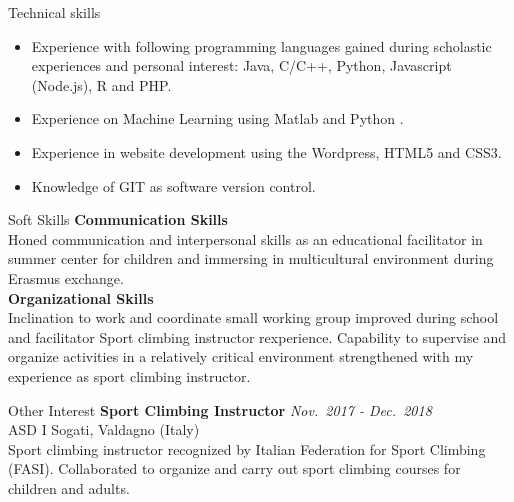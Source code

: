 \documentclass{resume} %
\begin{document}
\begin{rSection}{Technical skills}
    \begin{itemize}        
        \item Experience with following programming languages gained during scholastic experiences and personal interest: Java, C/C++, Python, Javascript (Node.js), R and PHP.
        \item Experience on Machine Learning using Matlab and Python .
        \item Experience in website development using the Wordpress, HTML5 and CSS3.
        \item Knowledge of GIT as software version control.
    \end{itemize}    
\end{rSection}

\begin{rSection}{Soft Skills}
        {\bf Communication Skills}\\
        Honed communication and interpersonal skills as an educational facilitator in summer center for children and immersing in multicultural environment during Erasmus exchange. \\
        {\bf Organizational Skills}\\
        Inclination to work and coordinate small working group improved during school and facilitator Sport climbing instructor rexperience.
        Capability to supervise and organize activities in a relatively critical environment strengthened with my experience as sport climbing instructor.
\end{rSection}

\begin{rSection}{Other Interest}
    {\bf Sport Climbing Instructor}
    \hfill {\em Nov.~2017 - Dec.~2018}\\
    ASD I Sogati, Valdagno (Italy) \\
    Sport climbing instructor recognized by Italian Federation for Sport Climbing (FASI). Collaborated to organize and carry out sport climbing courses for children and adults.
\end{rSection}
\end{document}
